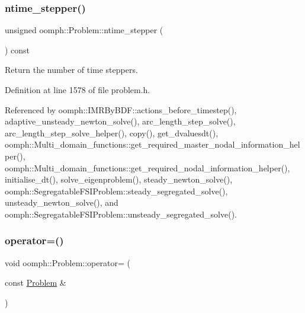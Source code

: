 \mbox{\label{classoomph_1_1Problem_ace3cdf55009c3bff21d2b7d3706d522a}} 
\subsubsection{\texorpdfstring{ntime\+\_\+stepper()}{ntime\_stepper()}}
{\footnotesize\ttfamily unsigned oomph\+::\+Problem\+::ntime\+\_\+stepper (\begin{DoxyParamCaption}{ }\end{DoxyParamCaption}) const\hspace{0.3cm}{\ttfamily [inline]}}



Return the number of time steppers. 



Definition at line 1578 of file problem.\+h.



Referenced by oomph\+::\+I\+M\+R\+By\+B\+D\+F\+::actions\+\_\+before\+\_\+timestep(), adaptive\+\_\+unsteady\+\_\+newton\+\_\+solve(), arc\+\_\+length\+\_\+step\+\_\+solve(), arc\+\_\+length\+\_\+step\+\_\+solve\+\_\+helper(), copy(), get\+\_\+dvaluesdt(), oomph\+::\+Multi\+\_\+domain\+\_\+functions\+::get\+\_\+required\+\_\+master\+\_\+nodal\+\_\+information\+\_\+helper(), oomph\+::\+Multi\+\_\+domain\+\_\+functions\+::get\+\_\+required\+\_\+nodal\+\_\+information\+\_\+helper(), initialise\+\_\+dt(), solve\+\_\+eigenproblem(), steady\+\_\+newton\+\_\+solve(), oomph\+::\+Segregatable\+F\+S\+I\+Problem\+::steady\+\_\+segregated\+\_\+solve(), unsteady\+\_\+newton\+\_\+solve(), and oomph\+::\+Segregatable\+F\+S\+I\+Problem\+::unsteady\+\_\+segregated\+\_\+solve().

\mbox{\label{classoomph_1_1Problem_ac620c30ee290674e73efcf159d533c01}} 
\subsubsection{\texorpdfstring{operator=()}{operator=()}}
{\footnotesize\ttfamily void oomph\+::\+Problem\+::operator= (\begin{DoxyParamCaption}\item[{const \hyperlink{classoomph_1_1Problem}{Problem} \&}]{ }\end{DoxyParamCaption})\hspace{0.3cm}{\ttfamily [inline]}}



